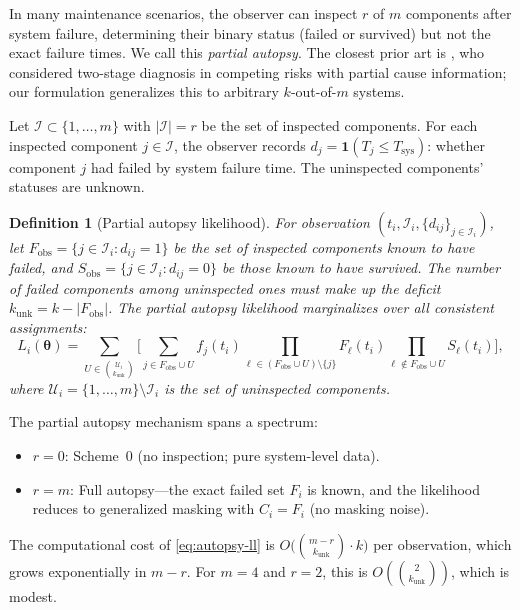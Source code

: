 \documentclass[12pt]{article}
\newtheorem{definition}{Definition}
\newcommand{\Tsys}{T_{\mathrm{sys}}}
\newcommand{\btheta}{\boldsymbol{\theta}}
\begin{document}
In many maintenance scenarios, the observer can inspect $r$ of $m$
components after system failure, determining their binary status
(failed or survived) but not the exact failure times.  We call this
\emph{partial autopsy}.  The closest prior art is
\citet{FlehingerReiserYashchin1998}, who considered two-stage diagnosis
in competing risks with partial cause information; our formulation
generalizes this to arbitrary $k$-out-of-$m$ systems.

Let $\mathcal{I} \subset \{1, \ldots, m\}$ with $|\mathcal{I}| = r$
be the set of inspected components.  For each inspected component
$j \in \mathcal{I}$, the observer records $d_j = \mathbf{1}(T_j \leq
\Tsys)$: whether component $j$ had failed by system failure time.
The uninspected components' statuses are unknown.

\begin{definition}[Partial autopsy likelihood]\label{def:autopsy-ll}
For observation $(t_i, \mathcal{I}_i, \{d_{ij}\}_{j \in \mathcal{I}_i})$,
let $F_{\text{obs}} = \{j \in \mathcal{I}_i : d_{ij} = 1\}$ be the
set of inspected components known to have failed, and
$S_{\text{obs}} = \{j \in \mathcal{I}_i : d_{ij} = 0\}$ be those known
to have survived.  The number of failed components among uninspected
ones must make up the deficit $k_{\text{unk}} = k - |F_{\text{obs}}|$.
The partial autopsy likelihood marginalizes over all consistent
assignments:
\begin{equation}\label{eq:autopsy-ll}
  L_i(\btheta) = \sum_{U \in \binom{\mathcal{U}_i}{k_\text{unk}}}
    \biggl[\sum_{j \in F_\text{obs} \cup U}
      f_j(t_i) \!\!\!\prod_{\ell \in (F_\text{obs} \cup U) \setminus \{j\}}
      \!\!\! F_\ell(t_i)
      \prod_{\ell \notin F_\text{obs} \cup U} S_\ell(t_i)\biggr],
\end{equation}
where $\mathcal{U}_i = \{1, \ldots, m\} \setminus \mathcal{I}_i$ is
the set of uninspected components.
\end{definition}

The partial autopsy mechanism spans a spectrum:
\begin{itemize}
  \item $r = 0$: Scheme~0 (no inspection; pure system-level data).
  \item $r = m$: Full autopsy---the exact failed set $F_i$ is
    known, and the likelihood reduces to generalized masking with
    $C_i = F_i$ (no masking noise).
\end{itemize}

The computational cost of \eqref{eq:autopsy-ll} is
$O\bigl(\binom{m-r}{k_{\text{unk}}} \cdot k\bigr)$ per observation,
which grows exponentially in $m - r$.  For $m = 4$ and $r = 2$, this
is $O(\binom{2}{k_{\text{unk}}})$, which is modest.
\end{document}
